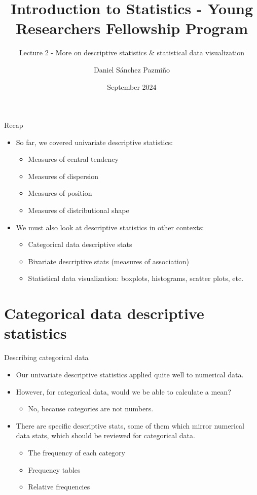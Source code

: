 \documentclass[
  10pt,
  ignorenonframetext,
]{beamer}
\title{Introduction to Statistics - Young Researchers Fellowship
Program}
\subtitle{Lecture 2 - More on descriptive statistics \& statistical data
visualization}
\author{Daniel Sánchez Pazmiño}
\date{September 2024}
\institute{Laboratorio de Investigación para el Desarrollo del Ecuador}
\providecommand{\tightlist}{%
  \setlength{\itemsep}{0pt}\setlength{\parskip}{0pt}}\usepackage{longtable,booktabs,array}
\begin{document}
\frame{\titlepage}

\begin{frame}{Recap}
\label{recap}
\begin{itemize}
\tightlist
\item
  So far, we covered univariate descriptive statistics:

  \begin{itemize}
  \tightlist
  \item
    Measures of central tendency
  \item
    Measures of dispersion
  \item
    Measures of position
  \item
    Measures of distributional shape
  \end{itemize}
\item
  We must also look at descriptive statistics in other contexts:

  \begin{itemize}
  \tightlist
  \item
    Categorical data descriptive stats
  \item
    Bivariate descriptive stats (measures of association)
  \item
    Statistical data visualization: boxplots, histograms, scatter plots,
    etc.
  \end{itemize}
\end{itemize}
\end{frame}

\section{Categorical data descriptive
statistics}\label{categorical-data-descriptive-statistics}

\begin{frame}{Describing categorical data}
\label{describing-categorical-data}
\begin{itemize}
\item
  Our univariate descriptive statistics applied quite well to numerical
  data.
\item
  However, for categorical data, would we be able to calculate a mean?

  \begin{itemize}
  \tightlist
  \item
    No, because categories are not numbers.
  \end{itemize}
\item
  There are specific descriptive stats, some of them which mirror
  numerical data stats, which should be reviewed for categorical data.

  \begin{itemize}
  \tightlist
  \item
    The frequency of each category
  \item
    Frequency tables
  \item
    Relative frequencies
  \end{itemize}
\end{itemize}
\end{frame}
\end{document}
